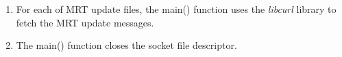 \begin{enumerate}
\begin{enumerate}
\item{For each of MRT update files, the main()  function uses the \emph{libcurl} library to fetch the MRT update  messages. }


\item{The main() function closes the socket file descriptor.}




\end{enumerate}

\end{enumerate}








